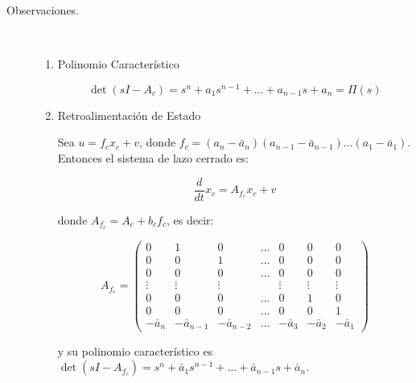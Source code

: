         \begin{description}
            \item [Observaciones.] \mbox{}\\
            \begin{enumerate}
                \item Polinomio Característico

                \begin{equation}
                    \det{(sI - A_c)} = s^n + a_1 s^{n-1} + \dots + a_{n-1} s + a_n = \Pi(s) \nonumber
                \end{equation}

                \item Retroalimentación de Estado

                Sea $u = f_c x_c + v$, donde $f_c = (a_n - \bar{a}_n)(a_{n-1} - \bar{a}_{n-1})\dots(a_1 - \bar{a}_1)$. Entonces el sistema de lazo cerrado es:

                \begin{equation}
                    \frac{d}{dt} x_c = A_{f_c} x_c + v
                \end{equation}

                donde $A_{f_c} = A_c + b_c f_c$, es decir:

                \begin{equation}
                    A_{f_c} =
                    \begin{pmatrix}
                    0 & 1 & 0 & \dots & 0 & 0 & 0 \\
                    0 & 0 & 1 & \dots & 0 & 0 & 0 \\
                    0 & 0 & 0 & \dots & 0 & 0 & 0 \\
                    \vdots & \vdots & \vdots & & \vdots & \vdots & \vdots \\
                    0 & 0 & 0 & \dots & 0 & 1 & 0 \\
                    0 & 0 & 0 & \dots & 0 & 0 & 1 \\
                    -\bar{a}_{n} & -\bar{a}_{n-1} & -\bar{a}_{n-2} & \dots & -\bar{a}_{3} & -\bar{a}_{2} & -\bar{a}_{1}
                    \end{pmatrix}
                \end{equation}

                y su polinomio característico es $\det{(sI - A_{f_c})} = s^n + \bar{a}_1 s^{n-1} + \dots + \bar{a}_{n-1} s + \bar{a}_n$.

            \end{enumerate}
        \end{description}

